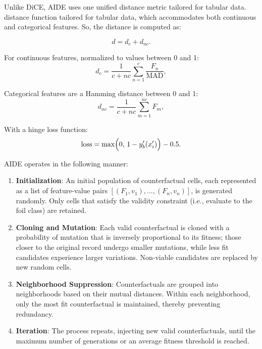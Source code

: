 Unlike DiCE, AIDE uses one unified distance metric tailored for tabular data. distance function tailored for tabular data, which accommodates both continuous and categorical features. So, the distance is computed as:

\begin{equation} \label{eq:aide-combined}
d = d_c + d_{nc}.
\end{equation}

For continuous features, normalized to values between 0 and 1:
\begin{equation} \label{eq:aide-dc}
d_c = \frac{1}{c + nc} \sum_{n=1}^{c} \frac{F_n}{\mathrm{MAD}},
\end{equation}

Categorical features are a Hamming distance between 0 and 1:
\begin{equation} \label{eq:aide-dnc}
d_{nc} = \frac{1}{c + nc} \sum_{m=1}^{nc} F_m,
\end{equation}

With a hinge loss function:
\begin{equation} \label{eq:aide-loss}
\text{loss} = \max\Bigl(0, \, 1 - y'_b(x'_i)\Bigr) - 0.5.
\end{equation}


AIDE operates in the following manner:

\begin{enumerate}
    \item \textbf{Initialization}: An initial population of counterfactual cells, each represented as a list of feature-value pairs $[(F_1, v_1),...,(F_n, v_n)]$, is generated randomly. Only cells that satisfy the validity constraint (i.e., evaluate to the foil class) are retained.
    \item \textbf{Cloning and Mutation}: Each valid counterfactual is cloned with a probability of mutation that is inversely proportional to its fitness; those closer to the original record undergo smaller mutations, while less fit candidates experience larger variations. Non-viable candidates are replaced by new random cells.
    \item \textbf{Neighborhood Suppression}: Counterfactuals are grouped into neighborhoods based on their mutual distances. Within each neighborhood, only the most fit counterfactual is maintained, thereby preventing redundancy.
    \item \textbf{Iteration}: The process repeats, injecting new valid counterfactuals, until the maximum number of generations or an average fitness threshold is reached.
\end{enumerate}

